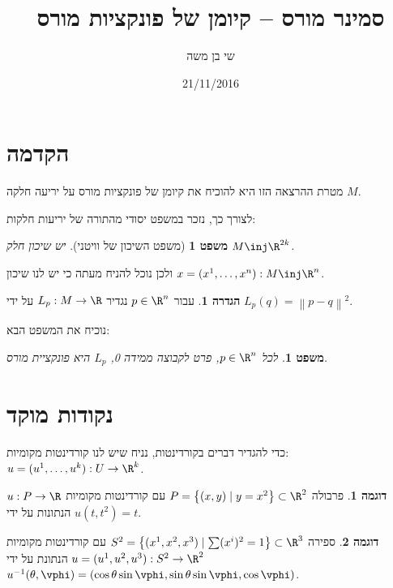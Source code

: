 \documentclass{article}
\title{סמינר מורס – קיומן של פונקציות מורס}
\author{שי בן משה}
\date{21/11/2016}
\newtheorem{theorem}{משפט}
\newtheorem*{theorem*}{משפט}
\theoremstyle{definition}
\newtheorem*{definition*}{הגדרה}
\newtheorem*{example*}{דוגמה}
\newcommand{\norm}[1]{\left\lVert#1\right\rVert}
\begin{document}
	\maketitle
	
	
	\section{הקדמה}
	
	מטרת ההרצאה הזו היא להוכיח את קיומן של פונקציות מורס על יריעה חלקה \(M\).
	
	לצורך כך, נזכר במשפט יסודי מהתורה של יריעות חלקות:
	\begin{theorem*}[משפט השיכון של וויטני]
		יש שיכון חלק
		\(M \inj \R^{2k}\).
	\end{theorem*}
	ולכן נוכל להניח מעתה כי יש לנו שיכון
	\(x=(x^1,\dotsc,x^n): M \inj \R^n\).
	
	\begin{definition*}
		עבור
		\(p\in \R^n\)
		נגדיר
		\(L_p:M\to \R\)
		על ידי
		\(L_p(q)=\norm{p-q}^2\).
	\end{definition*}

	נוכיח את המשפט הבא:
	\begin{theorem}
		לכל
		\(p\in \R^n\),
		פרט לקבוצה ממידה 0, \(L_p\) היא פונקציית מורס.
	\end{theorem}


	\section{נקודות מוקד}
	
	כדי להגדיר דברים בקורדינטות, נניח שיש לנו קורדינטות מקומיות:
	\(u=(u^1,\dotsc,u^k): U \to \R^k\).
	
	\begin{example*}
		פרבולה
		\(P = \left\{(x,y) \mid y=x^2 \right\} \subset \R^2 \)
		עם קורדינטות מקומיות
		\(u: P \to \R\)
		הנתונות על ידי
		\(u(t,t^2)=t\).
	\end{example*}

	\begin{example*}
		ספירה
		\(S^2 = \left\{(x^1,x^2,x^3) \mid \sum (x^i)^2 = 1 \right\} \subset \R^3 \)
		עם קורדינטות מקומיות
		\(u=(u^1,u^2,u^3): S^2 \to \R^2\)
		הנתונת על ידי
		\(
			u^{-1}(\theta, \vphi) = \left(
				\cos\theta \sin\vphi,
				\sin\theta \sin\vphi,
				\cos\vphi
			\right)
		\).
	\end{example*}
	
\end{document}
